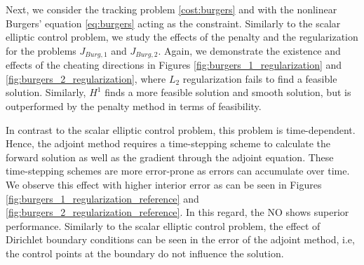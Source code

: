 \documentclass[final,1p,times]{elsarticle}
\theoremstyle{plain} %
\theoremstyle{definition} %
\theoremstyle{remark} %
\begin{document}
Next, we consider the tracking problem \eqref{cost:burgers} and with the nonlinear Burgers' equation \eqref{eq:burgers} acting as the constraint. Similarly to the scalar elliptic control problem, we study the effects of the penalty and the regularization for the problems $J_{Burg,1}$ and $J_{Burg,2}$. Again, we demonstrate the existence and effects of the cheating directions in Figures \ref{fig:burgers_1_regularization} and \ref{fig:burgers_2_regularization}, where $L_2$ regularization fails to find a feasible solution. Similarly, $H^1$ finds a more feasible solution and smooth solution, but is outperformed by the penalty method in terms of feasibility. 

In contrast to the scalar elliptic control problem, this problem is time-dependent. Hence, the adjoint method requires a time-stepping scheme to calculate the forward solution as well as the gradient through the adjoint equation. These time-stepping schemes are more error-prone as errors can accumulate over time. We observe this effect with higher interior error as can be seen in Figures \ref{fig:burgers_1_regularization_reference} and \ref{fig:burgers_2_regularization_reference}. In this regard, the NO shows superior performance. Similarly to the scalar elliptic control problem, the effect of Dirichlet boundary conditions can be seen in the error of the adjoint method, i.e, the control points at the boundary do not influence the solution.
\end{document}
